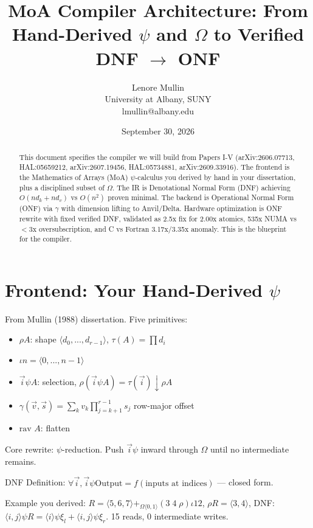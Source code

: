 \documentclass[11pt,a4paper]{article}
\title{MoA Compiler Architecture: From Hand-Derived $\psi$ and $\Omega$ to Verified DNF $\rightarrow$ ONF}
\author{Lenore Mullin \\ University at Albany, SUNY \\ lmullin@albany.edu}
\date{September 30, 2026}
\begin{document}
\maketitle

\begin{abstract}
This document specifies the compiler we will build from Papers I-V (arXiv:2606.07713, HAL:05659212, arXiv:2607.19456, HAL:05734881, arXiv:2609.33916). The frontend is the Mathematics of Arrays (MoA) $\psi$-calculus you derived by hand in your dissertation, plus a disciplined subset of $\Omega$. The IR is Denotational Normal Form (DNF) achieving $O(nd_k+nd_v)$ vs $O(n^2)$ proven minimal. The backend is Operational Normal Form (ONF) via $\gamma$ with dimension lifting to Anvil/Delta. Hardware optimization is ONF rewrite with fixed verified DNF, validated as 2.5x fix for 2.00x atomics, 535x NUMA vs $<$3x oversubscription, and C vs Fortran 3.17x/3.35x anomaly. This is the blueprint for the compiler.
\end{abstract}

\section{Frontend: Your Hand-Derived $\psi$}

From Mullin (1988) dissertation. Five primitives:
\begin{itemize}
\item $\rho A$: shape $\langle d_0,...,d_{r-1}\rangle$, $\tau(A)=\prod d_i$
\item $\iota n = \langle 0,...,n-1\rangle$
\item $\vec{i}\psi A$: selection, $\rho(\vec{i}\psi A)=\tau(\vec{i})\downarrow \rho A$
\item $\gamma(\vec{v},\vec{s})=\sum_{k} v_k \prod_{j=k+1}^{r-1} s_j$ row-major offset
\item $\text{rav } A$: flatten
\end{itemize}

Core rewrite: $\psi$-reduction. Push $\vec{i}\psi$ inward through $\Omega$ until no intermediate remains.

DNF Definition: $\forall \vec{i}, \vec{i}\psi \text{Output} = f(\text{inputs at indices})$ — closed form.

Example you derived: $R = \langle5,6,7\rangle +_{\Omega\langle0,1\rangle} (3\;4\;\rho)\iota12$, $\rho R=\langle3,4\rangle$, DNF: $\langle i,j\rangle\psi R = \langle i\rangle\psi\xi_l + \langle i,j\rangle\psi\xi_r$. 15 reads, 0 intermediate writes.
\end{document}

